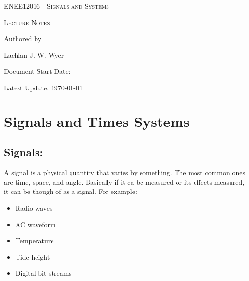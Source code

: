 \documentclass[a5paper]{article}
\date{24\textsuperscript{th} of September 2026}
\begin{document}
	\begin{titlepage}
		\centering
		{\Huge \textsc{ENEE12016 - Signals and Systems}\par}
		\vspace{1cm}
		{\Large \textsc{Lecture Notes}\par}
		\vspace{2.5cm}
		\vfill
		Authored by\par
		Lachlan J. W. Wyer
		\vfill
		\makeatletter
		{\large Document Start Date: \@date \par}
		\makeatother
		{\large Latest Update: \today\par}
	\end{titlepage}
	\tableofcontents
	\pagebreak

	\section{Signals and Times Systems}
	\subsection{Signals:}
	A signal is a physical quantity that varies by something. The most common ones are time, space, and angle. Basically if it ca be measured or its effects measured, it can be though of as a signal. For example:
	\begin{itemize}
		\item Radio waves
		\item AC waveform
		\item Temperature
		\item Tide height
		\item Digital bit streams
	\end{itemize}
\end{document}
